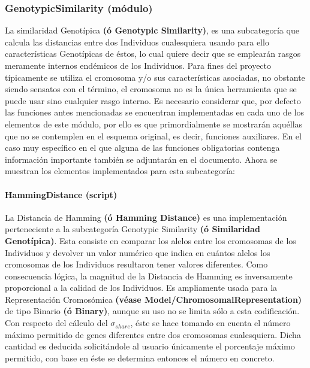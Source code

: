 \documentclass[class=report, crop=false]{standalone}
\begin{document}
\subsubsection{GenotypicSimilarity (módulo)}
\label{sec:a_2_5_1}
La similaridad Genotípica \textbf{(ó Genotypic Similarity)}, 
es una subcategoría que calcula las distancias entre dos 
Individuos cualesquiera usando para ello características 
Genotípicas de éstos, lo cual quiere decir que se emplearán 
rasgos meramente internos endémicos de los Individuos.\medskip\break
Para fines del proyecto típicamente se utiliza el cromosoma 
y/o sus características asociadas, no obstante siendo sensatos 
con el término, el cromosoma no es la única herramienta que 
se puede usar sino cualquier rasgo interno.\medskip\break
Es necesario considerar que, por defecto las funciones antes 
mencionadas se encuentran implementadas en cada uno de los elementos de 
este módulo, por ello es que primordialmente se mostrarán aquéllas que 
no se contemplen en el esquema original, es decir, funciones auxiliares.\break
En el caso muy específico en el que alguna de las funciones obligatorias 
contenga información importante también se adjuntarán en el documento.\break  
Ahora se muestran los elementos implementados para esta subcategoría:

\paragraph{HammingDistance (script)}
\label{sec:a_2_5_1_1}

\begin{fulllineitems}

\begin{DUlineblock}{0em}
\item[] La Distancia de Hamming \textbf{(ó Hamming Distance)} es una 
implementación perteneciente a la subcategoría Genotypic 
Similarity \textbf{(ó Similaridad Genotípica)}.
Esta consiste en comparar los alelos entre los cromosomas 
de los Individuos y devolver un valor numérico que indica en 
cuántos alelos los cromosomas de los Individuos resultaron 
tener valores diferentes.\break
Como consecuencia lógica, la magnitud de la Distancia de 
Hamming es inversamente proporcional a la calidad de los 
Individuos.\break
Es ampliamente usada para la Representación Cromosómica 
\textbf{(véase Model/}\break\textbf{ChromosomalRepresentation)} de tipo 
Binario \textbf{(ó Binary)}, aunque su uso no se limita 
sólo a esta codificación.\medskip\break
Con respecto del cálculo del \(\sigma_{share}\), éste se hace 
tomando en cuenta el número máximo permitido de genes 
diferentes entre dos cromosomas cualesquiera.\break
Dicha cantidad es deducida solicitándole al usuario únicamente 
el porcentaje máximo permitido, con base en éste se determina 
entonces el número en concreto.
\end{DUlineblock}

\end{fulllineitems}
\end{document}
